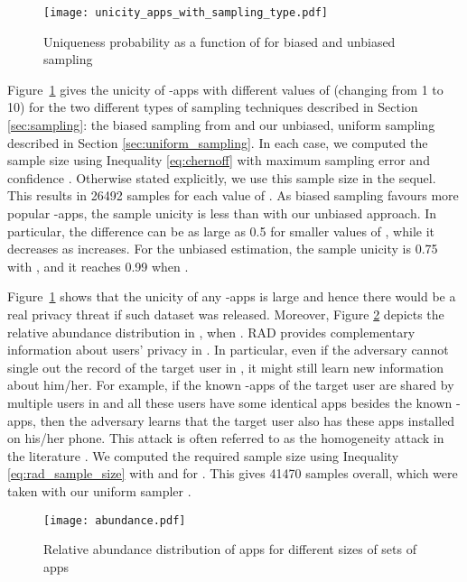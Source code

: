 \documentclass{acm_proc_article-sp}
\theoremstyle{plain}
\theoremstyle{plain}
\theoremstyle{plain}
\theoremstyle{plain}
\theoremstyle{plain}
\theoremstyle{plain}
\begin{document}
 \begin{figure}[h]
 	\texttt{[image: unicity\_apps\_with\_sampling\_type.pdf]}
 	\caption{Uniqueness probability as a function of  for biased and unbiased sampling}
 	\label{fig:unicity_with_sampling_type}
 \end{figure}

Figure~\ref{fig:unicity_with_sampling_type} gives the unicity of -apps with different values of  (changing from 1 to 10) for the two different types of sampling techniques described in Section \ref{sec:sampling}: the biased sampling from \cite{Nature13, Science15} and our unbiased, uniform sampling described in Section \ref{sec:uniform_sampling}.
In each case, we computed the sample size using Inequality \ref{eq:chernoff} with maximum sampling error  and confidence  .  Otherwise stated explicitly, we use this sample size in the sequel. This results in 26492 samples for each value of . As biased sampling favours more popular -apps, the sample unicity  is less than with our unbiased approach. In particular, the difference can be as large as 0.5 for smaller values of , while it decreases as  increases.
For the unbiased estimation, the sample unicity is 0.75 with , and it reaches 0.99 when .



Figure~\ref{fig:unicity_with_sampling_type} shows that the unicity of any -apps is large and hence there would be a real privacy threat if such dataset was released.
Moreover, Figure \ref{fig:relative_abundance} depicts the relative abundance distribution in , when . RAD provides complementary information about users' privacy in . In particular, even if the adversary cannot single out the record of the  target user in , it might still learn new information about him/her. For example, if the known -apps of the target user are shared by multiple users in  and all these users have some identical apps besides the known -apps, then the adversary learns that the target user also has these apps installed on his/her phone. This attack is often referred to as the homogeneity attack in the literature \cite{MachanavajjhalaKGV07}. We computed the required sample size using Inequality \ref{eq:rad_sample_size} with  and  for . This gives 41470 samples overall, which were taken with our uniform sampler .

\begin{figure}[h]
	\texttt{[image: abundance.pdf]}
	\caption{Relative abundance distribution of apps for different sizes of sets of apps}
	\label{fig:relative_abundance}
\end{figure}
\end{document}
